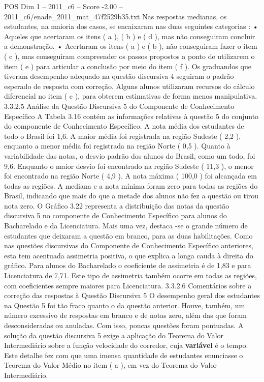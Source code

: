 \begin{textsample}{POS Dim 1 – 2011\_c6 – Score -2.00 – 2011\_c6/enade\_2011\_mat\_47f2529b35.txt}
Nas respostas medianas, os estudantes, na maioria dos casos, se encaixaram nas duas seguintes categorias : • Aqueles que acertaram os itens ( a ), ( b ) e ( d ), mas não conseguiram concluir a demonstração. • Acertaram os itens ( a ) e ( b ), não conseguiram fazer o item ( c ), mas conseguiram compreender os passos propostos a ponto de utilizarem o item ( e ) para articular a conclusão por meio do item ( f ).
Os graduandos que tiveram desempenho adequado na questão discursiva 4 seguiram o padrão esperado de resposta com correção.
Alguns alunos utilizaram recursos do cálculo diferencial no item ( c ), para obterem estimativas de forma menos manipulativa. 3.3.2.5 Análise da Questão Discursiva 5 do Componente de Conhecimento Específico A Tabela 3.16 contém as informações relativas à questão 5 do conjunto do componente de Conhecimento Específico.
A nota média dos estudantes de todo o Brasil foi 1,6.
A maior média foi registrada na região Sudeste ( 2,2 ), enquanto a menor média foi registrada na região Norte ( 0,5 ).
Quanto à variabilidade das notas, o desvio padrão dos alunos do Brasil, como um todo, foi 9,6.
Enquanto o maior desvio foi encontrado na região Sudeste ( 11,3 ), o menor foi encontrado na região Norte ( 4,9 ).
A nota máxima ( 100,0 ) foi alcançada em todas as regiões.
A mediana e a nota mínima foram zero para todas as regiões do Brasil, indicando que mais do que a metade dos alunos não fez a questão ou tirou nota zero.
O Gráfico 3.22 representa a distribuição das notas da questão discursiva 5 no componente de Conhecimento Específico para alunos do Bacharelado e da Licenciatura.
Mais uma vez, destaca -se o grande número de estudantes que deixaram a questão em branco, para as duas habilitações.
Como nas questões discursivas do Componente de Conhecimento Específico anteriores, esta tem acentuada assimetria positiva, o que explica a longa cauda à direita do gráfico.
Para alunos do Bacharelado o coeficiente de assimetria é de 1,83 e para Licenciatura de 7,71.
Este tipo de assimetria também ocorre em todas as regiões, com coeficientes sempre maiores para Licenciatura. 3.3.2.6 Comentários sobre a correção das respostas à Questão Discursiva 5 O desempenho geral dos estudantes na Questão 5 foi tão fraco quanto o da questão anterior.
Houve, também, um número excessivo de respostas em branco e de notas zero, além das que foram desconsideradas ou anuladas.
Com isso, poucas questões foram pontuadas.
A solução da questão discursiva 5 exige a aplicação do Teorema do Valor Intermediário sobre a função velocidade do corredor, cuja \textbf{variável} é o tempo.
Este detalhe fez com que uma imensa quantidade de estudantes enunciasse o Teorema do Valor Médio no item ( a ), em vez do Teorema do Valor Intermediário.

\end{textsample}
